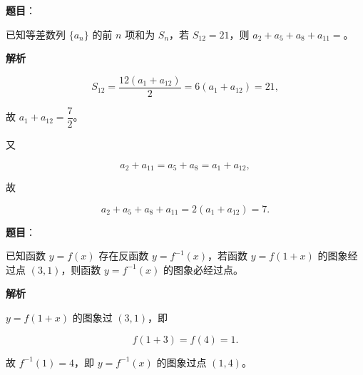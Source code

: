 \begin{answer}

\textbf{题目}：

已知等差数列 $\{a_n\}$ 的前 $n$ 项和为 $S_n$，若 $S_{12}=21$，则 $a_2+a_5+a_8+a_{11}=$\gkblank{}。

\textbf{解析}

\nopagebreak[4]
\[S_{12}=\frac{12(a_1+a_{12})}{2}=6(a_1+a_{12})=21,\]

故 $a_1+a_{12}=\dfrac72$。

又

\nopagebreak[4]
\[a_2+a_{11}=a_5+a_8=a_1+a_{12},\]

故

\nopagebreak[4]
\[a_2+a_5+a_8+a_{11}=2(a_1+a_{12})=7.\]


\end{answer}
\begin{answer}

\textbf{题目}：

已知函数 $y=f(x)$ 存在反函数 $y=f^{-1}(x)$，若函数 $y=f(1+x)$ 的图象经过点 $(3,1)$，则函数 $y=f^{-1}(x)$ 的图象必经过点\gkblank{}。

\textbf{解析}

$y=f(1+x)$ 的图象过 $(3,1)$，即

\nopagebreak[4]
\[f(1+3)=f(4)=1.\]

故 $f^{-1}(1)=4$，即 $y=f^{-1}(x)$ 的图象过点 $(1,4)$。


\end{answer}
